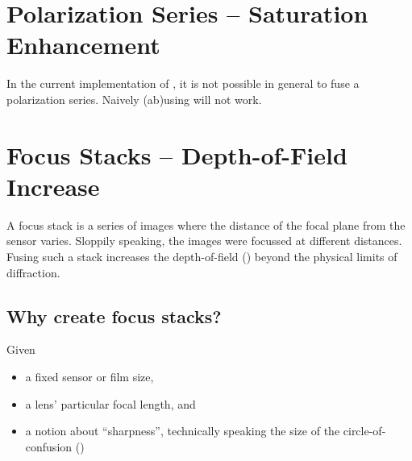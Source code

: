 


\section[Polarization Series -- Saturation Enhancement]{Polarization Series -- Saturation Enhancement
  \label{sec:polarization-series--saturation-enhancement}
  }


In the current implementation of \App{}, it is not possible in general
to fuse a polarization series.  Naively (ab)using
 will not work.


\section[Focus Stacks -- Depth-of-Field Increase]{Focus Stacks -- Depth-of-Field Increase
  \label{sec:focus-stacks--depth-of-field-increase}
  }


A focus stack is a series of images where the distance of the focal
plane from the sensor varies.  Sloppily speaking, the images were
focussed at different distances.  Fusing such a stack increases the
depth-of-field
() beyond the physical limits of
diffraction.


\subsection[Why create focus stacks?]{Why create focus stacks?
  \label{sec:why-create-focus-stacks}
  }

Given
\begin{itemize}
\item
  a fixed sensor or film size,
\item
  a lens' particular focal length, and
\item
  a notion about ``sharpness'', technically speaking the size of the
  circle-of-confusion
  ()
\end{itemize}

